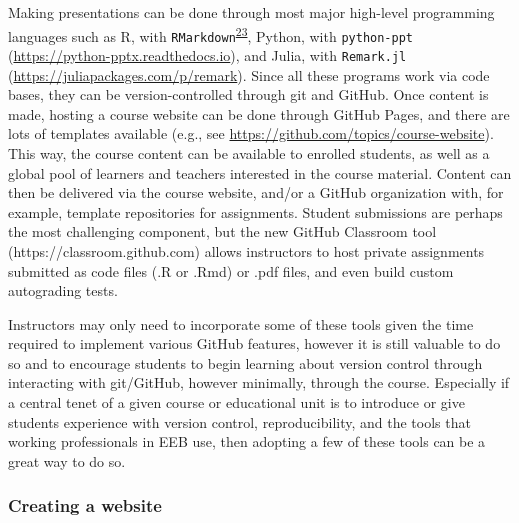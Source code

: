 Making presentations can be done through most major high-level programming languages such as R, with \texttt{RMarkdown}\textsuperscript{\protect\hyperlink{ref-QqMezOMg}{23}}, Python, with \texttt{python-ppt} (\url{https://python-pptx.readthedocs.io}), and Julia, with \texttt{Remark.jl} (\url{https://juliapackages.com/p/remark}).
Since all these programs work via code bases, they can be version-controlled through git and GitHub.
Once content is made, hosting a course website can be done through GitHub Pages, and there are lots of templates available (e.g., see \url{https://github.com/topics/course-website}).
This way, the course content can be available to enrolled students, as well as a global pool of learners and teachers interested in the course material.
Content can then be delivered via the course website, and/or a GitHub organization with, for example, template repositories for assignments.
Student submissions are perhaps the most challenging component, but the new GitHub Classroom tool (https://classroom.github.com) allows instructors to host private assignments submitted as code files (.R or .Rmd) or .pdf files, and even build custom autograding tests.

Instructors may only need to incorporate some of these tools given the time required to implement various GitHub features, however it is still valuable to do so and to encourage students to begin learning about version control through interacting with git/GitHub, however minimally, through the course.
Especially if a central tenet of a given course or educational unit is to introduce or give students experience with version control, reproducibility, and the tools that working professionals in EEB use, then adopting a few of these tools can be a great way to do so.

\hypertarget{creating-a-website}{%
\subsubsection{Creating a website}\label{creating-a-website}}

